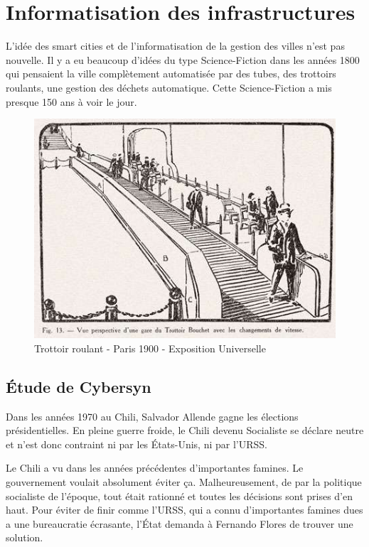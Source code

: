 \chapter{Informatisation des infrastructures}

L'idée des smart cities et de l'informatisation de la gestion des villes n'est pas nouvelle.
Il y a eu beaucoup d'idées du type Science-Fiction dans les années 1800 qui pensaient la ville
complètement automatisée par des tubes, des trottoirs roulants, une gestion des déchets automatique.
Cette Science-Fiction a mis presque 150 ans à voir le jour.

\begin{figure}[h]
  \centering
  \includegraphics[scale=0.30]{media/trottoir_roulant.jpg}
  \caption{Trottoir roulant - Paris 1900 - Exposition Universelle}
\end{figure}

\section{Étude de Cybersyn}

Dans les années 1970 au Chili, Salvador Allende gagne les élections présidentielles.
En pleine guerre froide, le Chili devenu Socialiste se déclare neutre et n'est donc
contraint ni par les États-Unis, ni par l'URSS.

Le Chili a vu dans les années précédentes d'importantes famines. Le gouvernement voulait
absolument éviter ça. Malheureusement, de par la politique socialiste de l'époque,
tout était rationné et toutes les décisions sont prises d'en haut.
Pour éviter de finir comme l'URSS, qui a connu d'importantes famines dues a une
bureaucratie écrasante, l'État demanda à Fernando Flores de trouver une solution.

